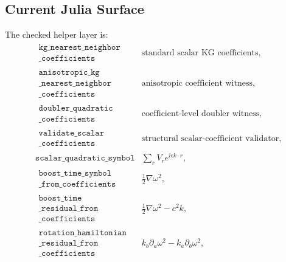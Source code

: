 \subsection{Current Julia Surface}

The checked helper layer is:
\[
\begin{array}{ll}
\begin{gathered}\texttt{kg\_nearest\_neighbor}\\\texttt{\_coefficients}\end{gathered}
  & \text{standard scalar KG coefficients},\\
\begin{gathered}\texttt{anisotropic\_kg}\\\texttt{\_nearest\_neighbor}\\\texttt{\_coefficients}\end{gathered}
  & \text{anisotropic coefficient witness},\\
\begin{gathered}\texttt{doubler\_quadratic}\\\texttt{\_coefficients}\end{gathered}
  & \text{coefficient-level doubler witness},\\
\begin{gathered}\texttt{validate\_scalar}\\\texttt{\_coefficients}\end{gathered}
  & \text{structural scalar-coefficient validator},\\
\texttt{scalar\_quadratic\_symbol}
  & \sum_rV_re^{i\epsilon k\cdot r},\\
\begin{gathered}\texttt{boost\_time\_symbol}\\\texttt{\_from\_coefficients}\end{gathered}
  & \frac12\nabla\omega^2,\\
\begin{gathered}\texttt{boost\_time}\\\texttt{\_residual\_from}\\\texttt{\_coefficients}\end{gathered}
  & \frac12\nabla\omega^2-c^2k,\\
\begin{gathered}\texttt{rotation\_hamiltonian}\\\texttt{\_residual\_from}\\\texttt{\_coefficients}\end{gathered}
  & k_b\partial_a\omega^2-k_a\partial_b\omega^2,\\

\end{array}\]
